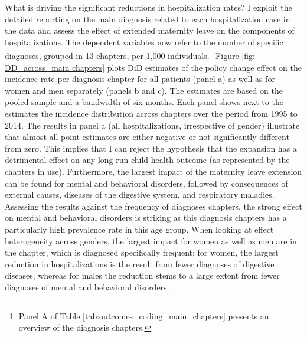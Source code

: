 \documentclass[11pt, a4paper,draft]{article} %
\begin{document}
What is driving the significant reductions in hospitalization rates? I exploit the detailed reporting on the main diagnosis related to each hospitalization case in the data and assess the effect of extended maternity leave on the components of hospitalizations. The dependent variables now refer to the number of specific diagnoses, grouped in 13 chapters, per 1,000 individuals.\footnote{Panel A of Table \ref{tab:outcomes_coding_main_chapters} presents an overview of the diagnosis chapters.} 
Figure \ref{fig: DD_across_main chapters} plots DiD estimates of the policy change effect on the incidence rate per diagnosis chapter for all patients (panel a) as well as for women and men separately (panels b and c). The estimates are based on the pooled sample and a bandwidth of six months. Each panel shows next to the estimates the incidence distribution across chapters over the period from 1995 to 2014. The results in panel a (all hospitalizations, irrespective of gender) illustrate that almost all point estimates are either negative or not significantly different from zero. This implies that I can reject the hypothesis that the expansion has a detrimental effect on any long-run child health outcome (as represented by the chapters in use). Furthermore, the largest impact of the maternity leave extension can be found for mental and behavioral disorders, followed by consequences of external causes, diseases of the digestive system, and respiratory maladies. Assessing the results against the frequency of diagnoses chapters, the strong effect on mental and behavioral disorders is striking as this diagnosis chapters has a particularly high prevalence rate in this age group. When looking at effect heterogeneity across genders, the largest impact for women as well as men are in the chapter, which is diagnosed specifically frequent: for women, the largest reduction in hospitalizations is the result from fewer diagnoses of digestive diseases, whereas for males the reduction stems to a large extent from fewer diagnoses of mental and behavioral disorders. \newline
\end{document}
